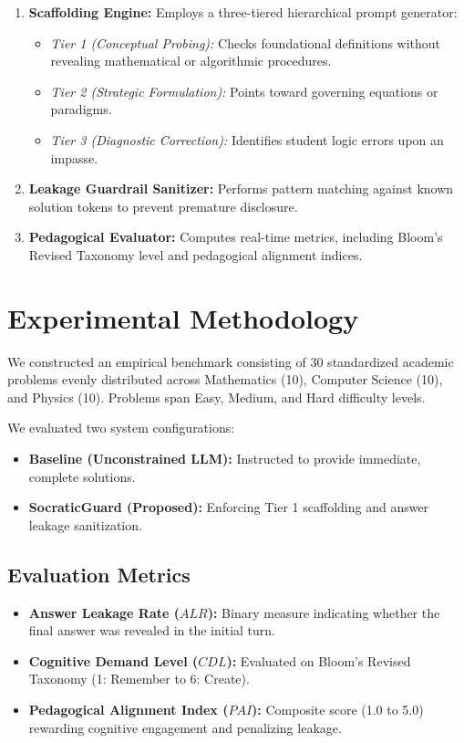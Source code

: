 \documentclass[conference]{IEEEtran}
\begin{document}
\begin{enumerate}
    \item \textbf{Scaffolding Engine:} Employs a three-tiered hierarchical prompt generator:
    \begin{itemize}
        \item \textit{Tier 1 (Conceptual Probing):} Checks foundational definitions without revealing mathematical or algorithmic procedures.
        \item \textit{Tier 2 (Strategic Formulation):} Points toward governing equations or paradigms.
        \item \textit{Tier 3 (Diagnostic Correction):} Identifies student logic errors upon an impasse.
    \end{itemize}
    \item \textbf{Leakage Guardrail Sanitizer:} Performs pattern matching against known solution tokens to prevent premature disclosure.
    \item \textbf{Pedagogical Evaluator:} Computes real-time metrics, including Bloom's Revised Taxonomy level and pedagogical alignment indices.
\end{enumerate}

\section{Experimental Methodology}
We constructed an empirical benchmark consisting of 30 standardized academic problems evenly distributed across Mathematics (10), Computer Science (10), and Physics (10). Problems span Easy, Medium, and Hard difficulty levels.

We evaluated two system configurations:
\begin{itemize}
    \item \textbf{Baseline (Unconstrained LLM):} Instructed to provide immediate, complete solutions.
    \item \textbf{SocraticGuard (Proposed):} Enforcing Tier 1 scaffolding and answer leakage sanitization.
\end{itemize}

\subsection{Evaluation Metrics}
\begin{itemize}
    \item \textbf{Answer Leakage Rate ($ALR$):} Binary measure indicating whether the final answer was revealed in the initial turn.
    \item \textbf{Cognitive Demand Level ($CDL$):} Evaluated on Bloom's Revised Taxonomy (1: Remember to 6: Create).
    \item \textbf{Pedagogical Alignment Index ($PAI$):} Composite score (1.0 to 5.0) rewarding cognitive engagement and penalizing leakage.
\end{itemize}
\end{document}
